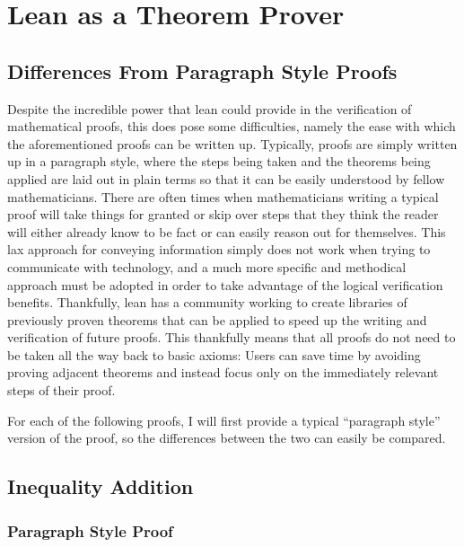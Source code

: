 \documentclass[
  letterpaper,
]{scrreprt}
\theoremstyle{remark}
\begin{document}

\hypertarget{lean-as-a-theorem-prover}{%
\chapter{Lean as a Theorem Prover}\label{lean-as-a-theorem-prover}}

\hypertarget{differences-from-paragraph-style-proofs}{%
\section{Differences From Paragraph Style
Proofs}\label{differences-from-paragraph-style-proofs}}

Despite the incredible power that lean could provide in the verification
of mathematical proofs, this does pose some difficulties, namely the
ease with which the aforementioned proofs can be written up. Typically,
proofs are simply written up in a paragraph style, where the steps being
taken and the theorems being applied are laid out in plain terms so that
it can be easily understood by fellow mathematicians. There are often
times when mathematicians writing a typical proof will take things for
granted or skip over steps that they think the reader will either
already know to be fact or can easily reason out for themselves. This
lax approach for conveying information simply does not work when trying
to communicate with technology, and a much more specific and methodical
approach must be adopted in order to take advantage of the logical
verification benefits. Thankfully, lean has a community working to
create libraries of previously proven theorems that can be applied to
speed up the writing and verification of future proofs. This thankfully
means that all proofs do not need to be taken all the way back to basic
axioms: Users can save time by avoiding proving adjacent theorems and
instead focus only on the immediately relevant steps of their proof.

For each of the following proofs, I will first provide a typical
``paragraph style'' version of the proof, so the differences between the
two can easily be compared.

\hypertarget{inequality-addition}{%
\section{Inequality Addition}\label{inequality-addition}}

\hypertarget{paragraph-style-proof}{%
\subsection{Paragraph Style Proof}\label{paragraph-style-proof}}
\end{document}
